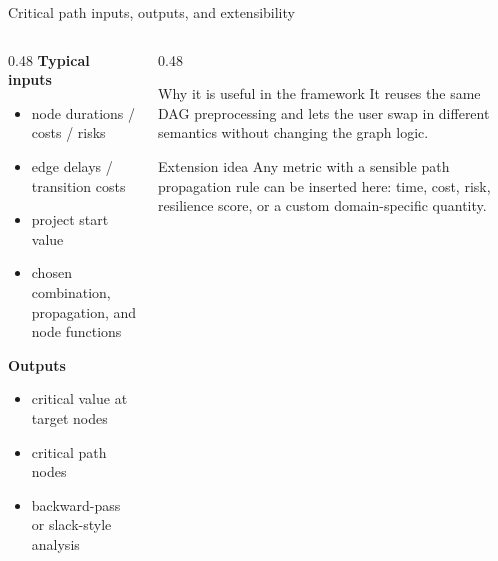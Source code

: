 \documentclass[aspectratio=169]{beamer}
\newcommand{\tightlist}{\setlength{\itemsep}{4pt}\setlength{\parskip}{2pt}}
\begin{document}
\begin{frame}{Critical path inputs, outputs, and extensibility}
\begin{columns}[t]
\begin{column}{0.48\textwidth}
\textbf{Typical inputs}
\begin{itemize}
\tightlist
\item node durations / costs / risks
\item edge delays / transition costs
\item project start value
\item chosen combination, propagation, and node functions
\end{itemize}

\vspace{0.2cm}
\textbf{Outputs}
\begin{itemize}
\tightlist
\item critical value at target nodes
\item critical path nodes
\item backward-pass or slack-style analysis
\end{itemize}
\end{column}

\begin{column}{0.48\textwidth}
\begin{block}{Why it is useful in the framework}
\small
It reuses the same DAG preprocessing and lets the user swap in different semantics without changing the graph logic.
\end{block}

\vspace{0.15cm}
\begin{block}{Extension idea}
\small
Any metric with a sensible path propagation rule can be inserted here: time, cost, risk, resilience score, or a custom domain-specific quantity.
\end{block}
\end{column}
\end{columns}
\end{frame}
\end{document}
